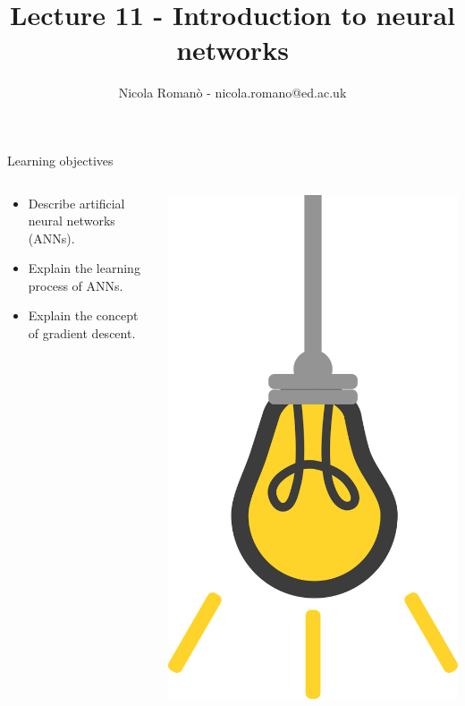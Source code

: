 \documentclass[9pt, aspectratio=169]{beamer}
\author{Nicola Roman\`o - nicola.romano@ed.ac.uk}
\title{Lecture 11 - Introduction to neural networks}
\date{}
\begin{document}

\begin{frame}
    \titlepage
\end{frame}

\begin{frame}
    {Learning objectives}
    \begin{columns}
        \begin{column}{0.8\textwidth}
            \begin{itemize}
                \item Describe artificial neural networks (ANNs).
                \item Explain the learning process of ANNs.
                \item Explain the concept of gradient descent.
            \end{itemize}
        \end{column}
        \begin{column}{0.2\textwidth}
            \includegraphics[angle=-30, origin=tr, width=1.5\textwidth]{lightbulb.png}

\end{column}
\end{columns}
\end{frame}
\end{document}
